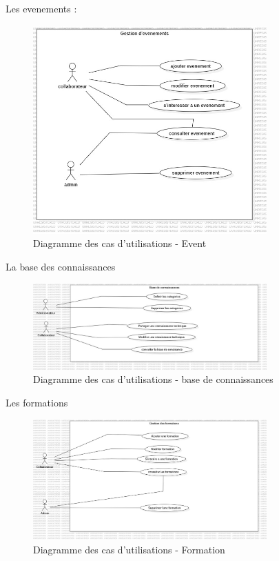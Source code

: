\documentclass{article}
\begin{document}
                Les evenements : 
                \begin{figure}[h!]
                    \centering
                    \includegraphics[width=0.8\textwidth]{assets/diagrammes/jpg/Model2!UseCaseEvent_1.jpg}
                    \caption{Diagramme des cas d'utilisations - Event}
                \end{figure}
                
                \FloatBarrier
                
                La base des connaissances
                \begin{figure}[h!]
                    \centering
                    \includegraphics[width=0.8\textwidth]{assets/diagrammes/jpg/Model3!UseCaseDoc_2.jpg}
                    \caption{Diagramme des cas d'utilisations - base de connaissances}
                \end{figure}
                
                \FloatBarrier
                
                Les formations
                \begin{figure}[h!]
                    \centering
                    \includegraphics[width=0.8\textwidth]{assets/diagrammes/jpg/Model4!UseCaseFormation_3.jpg}
                    \caption{Diagramme des cas d'utilisations - Formation}
                \end{figure}
                
\end{document}
